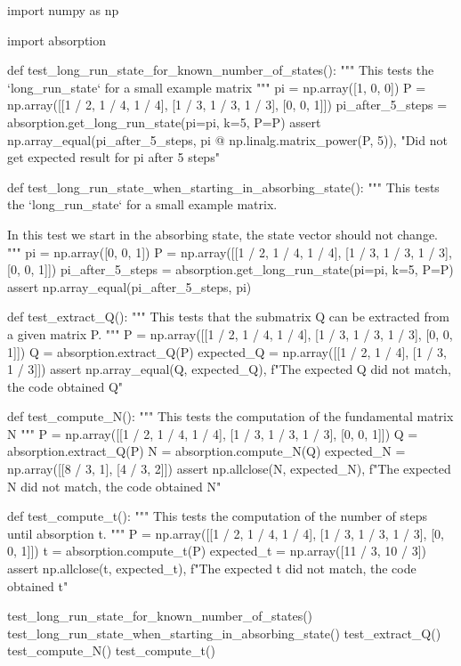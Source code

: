 \begin{pyin}
import numpy as np

import absorption

def test_long_run_state_for_known_number_of_states():
    """
    This tests the `long_run_state` for a small example matrix
    """
    pi = np.array([1, 0, 0])
    P = np.array([[1 / 2, 1 / 4, 1 / 4], [1 / 3, 1 / 3, 1 / 3], [0, 0, 1]])
    pi_after_5_steps = absorption.get_long_run_state(pi=pi, k=5, P=P)
    assert np.array_equal(pi_after_5_steps, pi @ np.linalg.matrix_power(P, 5)), "Did not get expected result for pi after 5 steps"


def test_long_run_state_when_starting_in_absorbing_state():
    """
    This tests the `long_run_state` for a small example matrix.

    In this test we start in the absorbing state, the state vector should not
    change.
    """
    pi = np.array([0, 0, 1])
    P = np.array([[1 / 2, 1 / 4, 1 / 4], [1 / 3, 1 / 3, 1 / 3], [0, 0, 1]])
    pi_after_5_steps = absorption.get_long_run_state(pi=pi, k=5, P=P)
    assert np.array_equal(pi_after_5_steps, pi)


def test_extract_Q():
    """
    This tests that the submatrix Q can be extracted from a given matrix P.
    """
    P = np.array([[1 / 2, 1 / 4, 1 / 4], [1 / 3, 1 / 3, 1 / 3], [0, 0, 1]])
    Q = absorption.extract_Q(P)
    expected_Q = np.array([[1 / 2, 1 / 4], [1 / 3, 1 / 3]])
    assert np.array_equal(Q, expected_Q), f"The expected Q did not match, the code obtained {Q}"


def test_compute_N():
    """
    This tests the computation of the fundamental matrix N
    """
    P = np.array([[1 / 2, 1 / 4, 1 / 4], [1 / 3, 1 / 3, 1 / 3], [0, 0, 1]])
    Q = absorption.extract_Q(P)
    N = absorption.compute_N(Q)
    expected_N = np.array([[8 / 3, 1], [4 / 3, 2]])
    assert np.allclose(N, expected_N), f"The expected N did not match, the code obtained {N}"


def test_compute_t():
    """
    This tests the computation of the number of steps until absorption t.
    """
    P = np.array([[1 / 2, 1 / 4, 1 / 4], [1 / 3, 1 / 3, 1 / 3], [0, 0, 1]])
    t = absorption.compute_t(P)
    expected_t = np.array([11 / 3, 10 / 3])
    assert np.allclose(t, expected_t), f"The expected t did not match, the code obtained {t}"


test_long_run_state_for_known_number_of_states()
test_long_run_state_when_starting_in_absorbing_state()
test_extract_Q()
test_compute_N()
test_compute_t()
\end{pyin}


